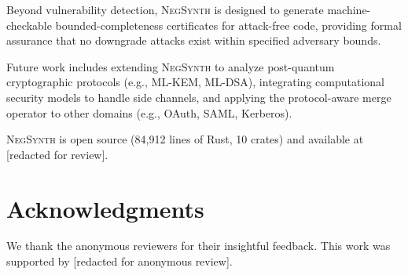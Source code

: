 \documentclass[10pt,twocolumn]{article}
\begin{document}
Beyond vulnerability detection, \textsc{NegSynth} is designed to generate machine-checkable bounded-completeness certificates for attack-free code, providing formal assurance that no downgrade attacks exist within specified adversary bounds.

Future work includes extending \textsc{NegSynth} to analyze post-quantum cryptographic protocols (e.g., ML-KEM, ML-DSA), integrating computational security models to handle side channels, and applying the protocol-aware merge operator to other domains (e.g., OAuth, SAML, Kerberos).

\textsc{NegSynth} is open source (84{,}912 lines of Rust, 10 crates) and available at [redacted for review].

\section*{Acknowledgments}

We thank the anonymous reviewers for their insightful feedback. This work was supported by [redacted for anonymous review].
\end{document}
